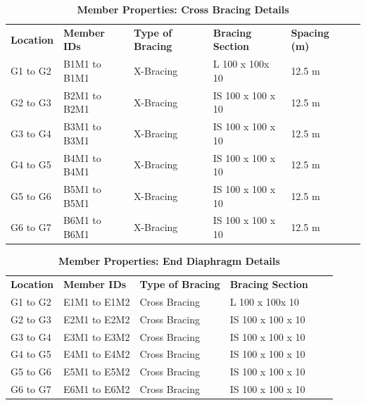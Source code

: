 \documentclass[12pt,a4paper]{report}
\numberwithin{table}{chapter}
\numberwithin{figure}{chapter}
\begin{document}
\begin{longtable}{|L{2.2cm}|L{2.2cm}|L{3.0cm}|L{2.5cm}|C{1.8cm}|C{1.8cm}|}
\caption{\textbf{Member Properties: Cross Bracing Details}} \\
\hline
\endfirsthead
\hline
\caption{\textbf{Member Properties: Cross Bracing Details}} \\
\hline
\endhead
\textbf{Location} & \textbf{Member IDs} & \textbf{Type of Bracing} & \textbf{Bracing Section} & \textbf{Spacing (m)} \\
\hline
G1 to G2 & B1M1 to B1M1 & X-Bracing & L 100 x 100x 10 & 12.5 m \\[6pt]
\hline
G2 to G3 & B2M1 to B2M1 & X-Bracing & IS 100 x 100 x 10 & 12.5 m \\[6pt]
\hline
G3 to G4 & B3M1 to B3M1 & X-Bracing & IS 100 x 100 x 10 & 12.5 m \\[6pt]
\hline
G4 to G5 & B4M1 to B4M1 & X-Bracing & IS 100 x 100 x 10 & 12.5 m \\[6pt]
\hline
G5 to G6 & B5M1 to B5M1 & X-Bracing & IS 100 x 100 x 10 & 12.5 m \\[6pt]
\hline
G6 to G7 & B6M1 to B6M1 & X-Bracing & IS 100 x 100 x 10 & 12.5 m \\[6pt]
\hline
\end{longtable}

\vspace{0.4em}
\noindent
\setlength{\tabcolsep}{4pt}
\setlength\LTleft{0pt}
\setlength\LTright{\fill}

\begin{longtable}{|L{2.2cm}|L{2.2cm}|L{3.0cm}|L{2.5cm}|C{1.8cm}|C{1.8cm}|}
\caption{\textbf{Member Properties: End Diaphragm Details}} \\
\hline
\endfirsthead
\hline
\caption{\textbf{Member Properties: End Diaphragm Details}} \\
\hline
\endhead
\textbf{Location} & \textbf{Member IDs} & \textbf{Type of Bracing} & \textbf{Bracing Section} \\
\hline
G1 to G2 & E1M1 to E1M2 & Cross Bracing & L 100 x 100x 10 \\[6pt]
\hline
G2 to G3 & E2M1 to E2M2 & Cross Bracing & IS 100 x 100 x 10 \\[6pt]
\hline
G3 to G4 & E3M1 to E3M2 & Cross Bracing & IS 100 x 100 x 10 \\[6pt]
\hline
G4 to G5 & E4M1 to E4M2 & Cross Bracing & IS 100 x 100 x 10 \\[6pt]
\hline
G5 to G6 & E5M1 to E5M2 & Cross Bracing & IS 100 x 100 x 10 \\[6pt]
\hline
G6 to G7 & E6M1 to E6M2 & Cross Bracing & IS 100 x 100 x 10 \\[6pt]
\hline
\end{longtable}
\end{document}

